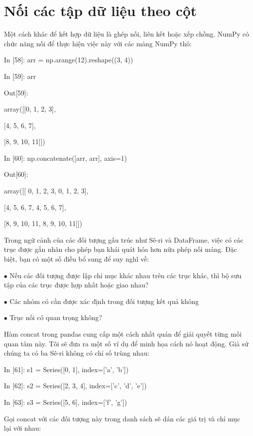 \section{Nối các tập dữ liệu theo cột}
    Một cách khác để kết hợp dữ liệu là ghép nối, liên kết hoặc xếp chồng. NumPy có chức năng nối để thực hiện việc này với các mảng NumPy thô: \par
    \quad\textup In [58]: arr = np.arange(12).reshape((3, 4))\par
    \quad\textup In [59]: arr \par
    \quad\textup Out[59]: \par
    \quad\textup array([[0, 1, 2, 3],\par
    \quad\quad\quad\quad\textup[4, 5, 6, 7],\par
    \quad\quad\quad\quad\textup[8, 9, 10, 11]])\par
    \quad\textup In [60]: np.concatenate([arr, arr], axis=1)\par
    \quad\textup Out[60]:\par
    \quad\textup array([[ 0, 1, 2, 3, 0, 1, 2, 3],\par
    \quad\quad\quad\quad\textup[4, 5, 6, 7, 4, 5, 6, 7],\par
    \quad\quad\quad\quad\textup[8, 9, 10, 11, 8, 9, 10, 11]])\par
    Trong ngữ cảnh của các đối tượng gấu trúc như Sê-ri và DataFrame, việc có các trục được gắn nhãn cho phép bạn khái quát hóa hơn nữa phép nối mảng. Đặc biệt, bạn có một số điều bổ sung để suy nghĩ về:\par
 $\bullet$ Nếu các đối tượng được lập chỉ mục khác nhau trên các trục khác, thì bộ sưu tập của các trục được hợp nhất hoặc giao nhau? \par
  $\bullet$ Các nhóm có cần được xác định trong đối tượng kết quả không \par
  $\bullet$  Trục nối có quan trọng không? \par
    Hàm concat trong pandas cung cấp một cách nhất quán để giải quyết từng mối quan tâm này. Tôi sẽ đưa ra một số ví dụ để minh họa cách nó hoạt động. Giả sử chúng ta có ba Sê-ri không có chỉ số trùng nhau: 
    \par\quad\textup In [61]: s1 = Series([0, 1], index=['a', 'b'])
    \par\quad\textup In [62]: s2 = Series([2, 3, 4], index=['c', 'd', 'e'])
    \par\quad\textup In [63]: s3 = Series([5, 6], index=['f', 'g'])
    \par Gọi concat với các đối tượng này trong danh sách sẽ dán các giá trị và chỉ mục lại với nhau: 
